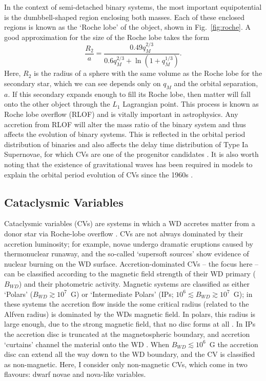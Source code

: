 In the context of semi-detached binary systems, the most important equipotential
is the dumbbell-shaped region enclosing both masses. Each of these
enclosed regions is known as the `Roche lobe' of the object, shown in 
Fig.~\ref{fig:roche}. A good approximation
for the size of the Roche lobe takes the form \citep{eggleton1983}
\begin{equation}
\frac{R_2}{a} = \frac{0.49 q_M^{2/3}}{0.6q_M^{2/3} + \ln(1+q_M^{1/3})}.
\label{eq:roche2}
\end{equation} 
Here, $R_2$ is the radius of a sphere with the same volume as the Roche lobe for the
secondary star, which we can see depends only on $q_M$ and the orbital separation, 
$a$. If this secondary expands enough to fill its Roche lobe, then matter
will fall onto the other object through the $L_1$ Lagrangian point. 
This process is known as Roche lobe overflow (RLOF)
and is vitally important in astrophysics. 
Any accretion from RLOF will alter the mass ratio of the binary system 
and thus affects the evolution of binary systems. 
This is reflected in the orbital period
distribution of binaries \citep[e.g.][]{knigge2011_evo} 
and also affects the delay time distribution
of Type Ia Supernovae, for which CVs are one of the progenitor candidates 
\citep[e.g.][]{wang2012}.
It is also worth noting that the existence of gravitational waves has been 
required in models to explain the orbital period evolution of CVs since
the 1960s \citep{kraft1962}. 


\subsection{Cataclysmic Variables}

Cataclysmic variables (CVs) are systems in which a WD
accretes matter from a donor star via Roche-lobe overflow 
\citep[see the `CV bible', ][]{warnerbook}. 
CVs are not always dominated by their accretion luminosity; 
for example, novae undergo dramatic eruptions caused
by thermonuclear runaway, and the so-called `supersoft sources' show evidence
of nuclear burning on the WD surface.
Accretion-dominated CVs -- the focus here -- can be classified according to the 
magnetic field strength of their WD primary ($B_{WD} $) and their 
photometric activity. 
Magnetic systems are classified as either `Polars' ($B_{WD} \gtrsim 10^7$~G)
or `Intermediate Polars' (IPs; $10^6 \lesssim B_{WD}  \gtrsim 10^7$~G);
in these systems the accretion flow inside the some critical radius 
(related to the Alfven radius)
is dominated by the WDs magnetic field. 
In polars, this radius is large enough, due to the strong magnetic field,
that no disc forms at all \citep{liebert1985}. In IPs the accretion
disc is truncated at the magnetospheric boundary, and accretion `curtains'
channel the material onto the WD \citep[e.g.][]{patterson1994,evans2004}.
When $B_{WD} \lesssim 10^6$~G the accretion disc can extend all the
way down to the WD boundary, and the CV is classified as non-magnetic.
Here, I consider only non-magnetic CVs, which come in two flavours:
dwarf novae and nova-like variables.


